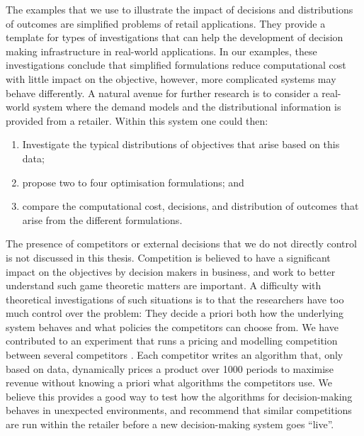 \documentclass[main.tex]{subfiles}
\begin{document}
The examples that we use to illustrate the impact of decisions and
distributions of outcomes are simplified problems of retail
applications. They provide a template for types of investigations that
can help the development of decision making infrastructure in
real-world applications.  In our examples, these investigations
conclude that simplified formulations reduce computational cost with
little impact on the objective, however, more complicated systems may
behave differently.  A natural avenue for further research is to
consider a real-world system where the demand models and the
distributional information is provided from a retailer. Within this
system one could then:
\begin{enumerate}
\item Investigate the typical distributions of objectives that arise
  based on this data;
\item propose two to four optimisation formulations; and
\item compare the computational cost, decisions, and distribution of
  outcomes that arise from the different formulations.
\end{enumerate}

The presence of competitors or external decisions that we do not
directly control is not discussed in this thesis. Competition is
believed to have a significant impact on the objectives by decision
makers in business, and work to better understand such game theoretic
matters are important. A difficulty with theoretical investigations of
such situations is to that the researchers have too much control over
the problem: They decide a priori both how the underlying system
behaves and what policies the competitors can choose from.  We have
contributed to an experiment that runs a pricing and modelling
competition between several competitors \citep{geer2018dynamic}.  Each
competitor writes an algorithm that, only based on data, dynamically
prices a product over \num{1000} periods to maximise revenue without
knowing a priori what algorithms the competitors use. We believe this
provides a good way to test how the algorithms for decision-making
behaves in unexpected environments, and recommend that similar
competitions are run within the retailer before a new decision-making
system goes ``live''.



\biblio{} %
\end{document}
